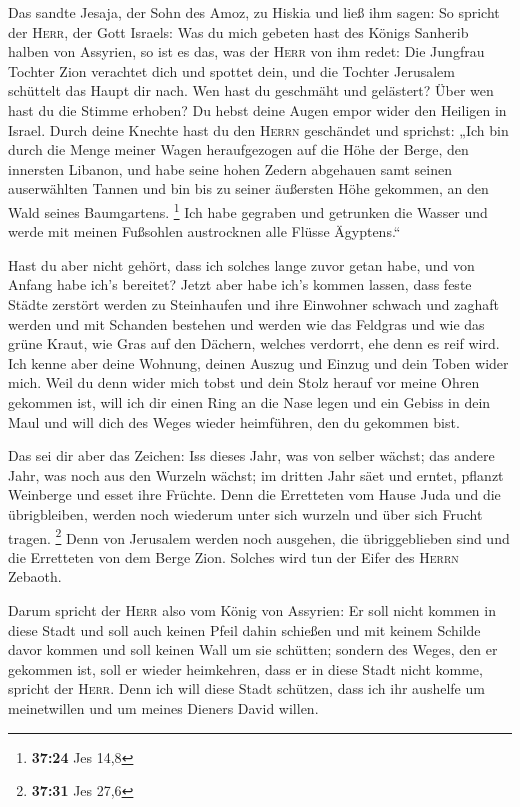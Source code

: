  Das sandte Jesaja, der Sohn des Amoz, zu Hiskia und ließ
ihm sagen: So spricht der \textsc{Herr}, der Gott Israels: Was du mich
gebeten hast des Königs Sanherib halben von Assyrien,  so
ist es das, was der \textsc{Herr} von ihm redet: Die Jungfrau Tochter
Zion verachtet dich und spottet dein, und die Tochter Jerusalem
schüttelt das Haupt dir nach.  Wen hast du geschmäht und
gelästert? Über wen hast du die Stimme erhoben? Du hebst deine Augen
empor wider den Heiligen in Israel.  Durch deine Knechte
hast du den \textsc{Herrn} geschändet und sprichst: „Ich bin durch die
Menge meiner Wagen heraufgezogen auf die Höhe der Berge, den innersten
Libanon, und habe seine hohen Zedern abgehauen samt seinen auserwählten
Tannen und bin bis zu seiner äußersten Höhe gekommen, an den Wald seines
Baumgartens. \footnote{\textbf{37:24} Jes 14,8}  Ich habe
gegraben und getrunken die Wasser und werde mit meinen Fußsohlen
austrocknen alle Flüsse Ägyptens.``

 Hast du aber nicht gehört, dass ich solches lange zuvor
getan habe, und von Anfang habe ich's bereitet? Jetzt aber habe ich's
kommen lassen, dass feste Städte zerstört werden zu Steinhaufen
 und ihre Einwohner schwach und zaghaft werden und mit
Schanden bestehen und werden wie das Feldgras und wie das grüne Kraut,
wie Gras auf den Dächern, welches verdorrt, ehe denn es reif wird.
 Ich kenne aber deine Wohnung, deinen Auszug und Einzug
und dein Toben wider mich.  Weil du denn wider mich tobst
und dein Stolz herauf vor meine Ohren gekommen ist, will ich dir einen
Ring an die Nase legen und ein Gebiss in dein Maul und will dich des
Weges wieder heimführen, den du gekommen bist.

 Das sei dir aber das Zeichen: Iss dieses Jahr, was von
selber wächst; das andere Jahr, was noch aus den Wurzeln wächst; im
dritten Jahr säet und erntet, pflanzt Weinberge und esset ihre Früchte.
 Denn die Erretteten vom Hause Juda und die übrigbleiben,
werden noch wiederum unter sich wurzeln und über sich Frucht tragen.
\footnote{\textbf{37:31} Jes 27,6}  Denn von Jerusalem
werden noch ausgehen, die übriggeblieben sind und die Erretteten von dem
Berge Zion. Solches wird tun der Eifer des \textsc{Herrn} Zebaoth.

 Darum spricht der \textsc{Herr} also vom König von
Assyrien: Er soll nicht kommen in diese Stadt und soll auch keinen Pfeil
dahin schießen und mit keinem Schilde davor kommen und soll keinen Wall
um sie schütten;  sondern des Weges, den er gekommen ist,
soll er wieder heimkehren, dass er in diese Stadt nicht komme, spricht
der \textsc{Herr}.  Denn ich will diese Stadt schützen,
dass ich ihr aushelfe um meinetwillen und um meines Dieners David
willen.

